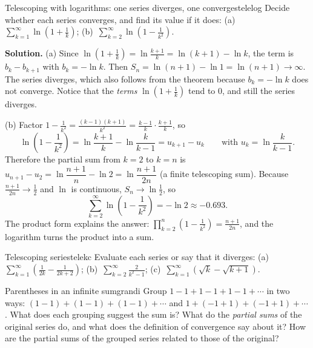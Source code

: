 \documentclass[11pt]{article}
\begin{document}
\begin{exmp}{Telescoping with logarithms: one series diverges, one converges}{telelog}
Decide whether each series converges, and find its value if it does: (a)~$\displaystyle\sum_{k=1}^\infty\ln\left(1+\frac1k\right)$; \quad (b)~$\displaystyle\sum_{k=2}^\infty\ln\left(1-\frac1{k^2}\right)$.

\textbf{Solution.} (a) Since $\ln\left(1+\frac1k\right)=\ln\frac{k+1}k=\ln(k+1)-\ln k$, the term is $b_k-b_{k+1}$ with $b_k=-\ln k$. Then $S_n=\ln(n+1)-\ln1=\ln(n+1)\to\infty$. The series diverges, which also follows from the theorem because $b_k=-\ln k$ does not converge. Notice that the \emph{terms} $\ln(1+\frac1k)$ tend to $0$, and still the series diverges.

(b) Factor $1-\frac1{k^2}=\frac{(k-1)(k+1)}{k^2}=\frac{k-1}k\cdot\frac{k+1}k$, so
\[
\ln\left(1-\frac1{k^2}\right)=\ln\frac{k+1}k-\ln\frac k{k-1}=u_{k+1}-u_k\qquad\text{with }u_k=\ln\frac k{k-1}.
\]
Therefore the partial sum from $k=2$ to $k=n$ is $u_{n+1}-u_2=\ln\dfrac{n+1}n-\ln2=\ln\dfrac{n+1}{2n}$ (a finite telescoping sum). Because $\frac{n+1}{2n}\to\frac12$ and $\ln$ is continuous, $S_n\to\ln\frac12$, so
\[
\sum_{k=2}^\infty\ln\left(1-\frac1{k^2}\right)=-\ln2\approx-0.693 .
\]
The product form explains the answer: $\prod_{k=2}^n\left(1-\frac1{k^2}\right)=\frac{n+1}{2n}$, and the logarithm turns the product into a sum.
\end{exmp}

\begin{kc}{Telescoping series}{telekc}
Evaluate each series or say that it diverges: (a)~$\displaystyle\sum_{k=1}^\infty\left(\frac1{2k}-\frac1{2k+2}\right)$; \quad (b)~$\displaystyle\sum_{k=2}^\infty\frac2{k^2-1}$; \quad (c)~$\displaystyle\sum_{k=1}^\infty\left(\sqrt k-\sqrt{k+1}\right)$.
\end{kc}

\begin{think}{Parentheses in an infinite sum}{grandi}
Group $1-1+1-1+1-1+\cdots$ in two ways: $(1-1)+(1-1)+(1-1)+\cdots$ and $1+(-1+1)+(-1+1)+\cdots$. What does each grouping suggest the sum is? What do the \emph{partial sums} of the original series do, and what does the definition of convergence say about it? How are the partial sums of the grouped series related to those of the original?
\end{think}
\end{document}
